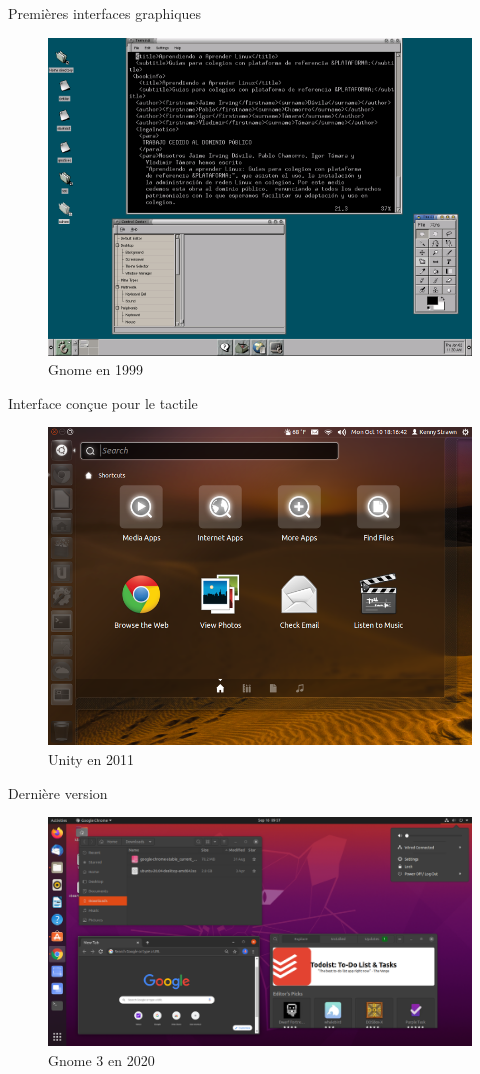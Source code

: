 \documentclass{beamer}
\begin{document}
\begin{frame}
  \center Premi\`eres interfaces graphiques
  \begin{figure}
    \includegraphics[width=0.8\linewidth]{images/GNOME-1999}
    \caption{Gnome en 1999}
  \end{figure}
\end{frame}

\begin{frame}
  \center Interface con\c{c}ue pour le tactile
  \begin{figure}
    \includegraphics[width=0.8\linewidth]{images/Unity-2011}
    \caption{Unity en 2011}
  \end{figure}
\end{frame}

\begin{frame}
  \center Dernière version
  \begin{figure}
    \includegraphics[width=0.8\linewidth]{images/GNOME-2020}
    \caption{Gnome 3 en 2020}
  \end{figure}
\end{frame}
\end{document}
